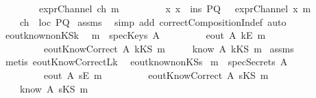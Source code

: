 \begin{isabellebody}
\ \ \ \ \ \ \ \ {\isachardoublequoteopen}exprChannel\ ch\ m{\isachardoublequoteclose}\isanewline
\ \ \ \ \ \ \ \ {\isachardoublequoteopen}{\isasymforall}\ x{\isachardot}\ x\ {\isasymin}\ ins\ PQ\ {\isasymlongrightarrow}\ {\isasymnot}\ exprChannel\ x\ m{\isachardoublequoteclose}\isanewline
{}\ \ \ \ {\isachardoublequoteopen}ch\ {\isacharcolon}\ loc\ PQ{\isachardoublequoteclose}\isanewline
%
\isadelimproof
%
\endisadelimproof
%
\isatagproof
{}\isamarkupfalse%
\ assms\ \isamarkupfalse%
\ {\isacharparenleft}simp\ add{\isacharcolon}\ correctCompositionIn{\isacharunderscore}def{\isacharcomma}\ auto{\isacharparenright}%
\endisatagproof
{\isafoldproof}%
%
\isadelimproof
\isanewline
%
\endisadelimproof
\isanewline
{}\isamarkupfalse%
\ eout{\isacharunderscore}know{\isacharunderscore}nonKS{\isacharunderscore}k{\isacharcolon}\ \isanewline
{}\ {\isachardoublequoteopen}m\ {\isasymnotin}\ specKeys\ A{\isachardoublequoteclose}\isanewline
\ \ \ \ \ \ \ \ \ {\isachardoublequoteopen}eout\ A\ {\isacharparenleft}kE\ m{\isacharparenright}{\isachardoublequoteclose}\isanewline
\ \ \ \ \ \ \ \ \ {\isachardoublequoteopen}eoutKnowCorrect\ A\ {\isacharparenleft}kKS\ m{\isacharparenright}{\isachardoublequoteclose}\isanewline
{}\ \ \ \ \ {\isachardoublequoteopen}know\ A\ {\isacharparenleft}kKS\ m{\isacharparenright}{\isachardoublequoteclose}\isanewline
%
\isadelimproof
%
\endisadelimproof
%
\isatagproof
{}\isamarkupfalse%
\ assms\ \isamarkupfalse%
\ {\isacharparenleft}metis\ eoutKnowCorrect{\isacharunderscore}L{}k{\isacharparenright}%
\endisatagproof
{\isafoldproof}%
%
\isadelimproof
\isanewline
%
\endisadelimproof
\isanewline
{}\isamarkupfalse%
\ \ eout{\isacharunderscore}know{\isacharunderscore}nonKS{\isacharunderscore}s{\isacharcolon}\isanewline
{}\ {\isachardoublequoteopen}m\ {\isasymnotin}\ specSecrets\ A{\isachardoublequoteclose}\isanewline
\ \ \ \ \ \ \ \ \ {\isachardoublequoteopen}eout\ A\ {\isacharparenleft}sE\ m{\isacharparenright}{\isachardoublequoteclose}\isanewline
\ \ \ \ \ \ \ \ \ {\isachardoublequoteopen}eoutKnowCorrect\ A\ {\isacharparenleft}sKS\ m{\isacharparenright}{\isachardoublequoteclose}\isanewline
{}\ \ \ \ {\isachardoublequoteopen}know\ A\ {\isacharparenleft}sKS\ m{\isacharparenright}{\isachardoublequoteclose}\isanewline
%
\isadelimproof
%
\endisadelimproof
%
\isatagproof
{}\isamarkupfalse%

\end{isabellebody}
